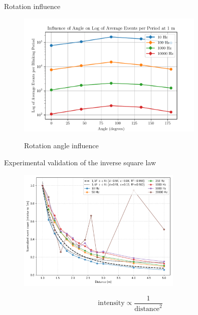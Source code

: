 \documentclass{beamer}
\begin{document}
\begin{frame}{Rotation influence}

\begin{figure}[H]
    \centering
    \includegraphics[width=0.8\textwidth]{../fig/semestral/angle2.pdf}
    \label{fig:rotation_influence}
    \caption{Rotation angle influence}
\end{figure}

\end{frame}

\begin{frame}{Experimental validation of the inverse square law}

    \begin{figure}
        \centering
        \includegraphics[width=0.70\textwidth]{../fig/pgfplot/build/inv_square.pdf}
        \label{fig:fit1}
    \end{figure}

    \vspace{-0.5cm}
    \begin{equation*}
        \text{intensity} \propto \frac{1}{\text{distance}^2}
    \end{equation*}

\end{frame}
\end{document}
